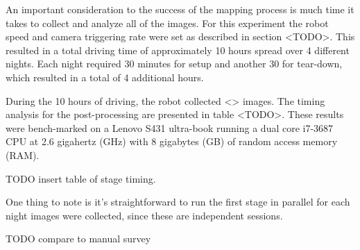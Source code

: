 An important consideration to the success of the mapping process is much time it takes to collect and analyze all of the images. For this experiment the robot speed and camera triggering rate were set as described in section <TODO>.  This resulted in a total driving time of approximately 10 hours spread over 4 different nights.  Each night required 30 minutes for setup and another 30 for tear-down, which resulted in a total of 4 additional hours.  

During the 10 hours of driving, the robot collected <> images.  The timing analysis for the post-processing are presented in table <TODO>. These results were bench-marked on a Lenovo S431 ultra-book running a dual core i7-3687 CPU at 2.6 gigahertz (GHz) with 8 gigabytes (GB) of random access memory (RAM).  

TODO insert table of stage timing.

One thing to note is it's straightforward to run the first stage in parallel for each night images were collected, since these are independent sessions.

TODO compare to manual survey
